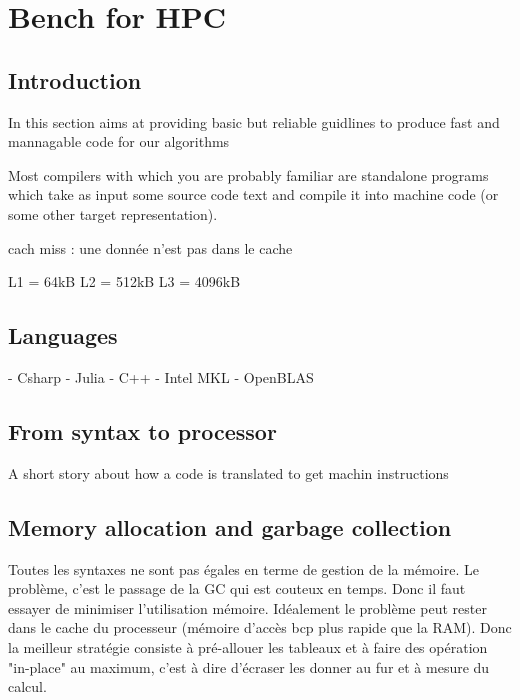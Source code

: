 \chapter{Bench for HPC}

\section{Introduction}

In this section aims at providing basic but reliable guidlines to produce fast and mannagable code
for our algorithms

Most compilers with which you are probably familiar are standalone programs which take as input some source code text and compile it into machine code (or some other target representation).

cach miss : une donnée n'est pas dans le cache

\cite{Drepper2007}
\cite{Akanksha2012}

%
%

L1 = 64kB
L2 = 512kB
L3 = 4096kB

\section{Languages}
- Csharp
- Julia
- C++
- Intel MKL
- OpenBLAS

\section{From syntax to processor}

A short story about how a code is translated to get machin instructions

\newpage
\section{Memory allocation and garbage collection}

Toutes les syntaxes ne sont pas égales en terme de gestion de la mémoire.
Le problème, c'est le passage de la GC qui est couteux en temps. Donc il faut essayer de minimiser l'utilisation mémoire. Idéalement le problème peut rester dans le cache du processeur (mémoire d'accès bcp plus rapide que la RAM). Donc la meilleur stratégie consiste à pré-allouer les tableaux et à faire des opération "in-place" au maximum, c'est à dire d'écraser les donner au fur et à mesure du calcul.


